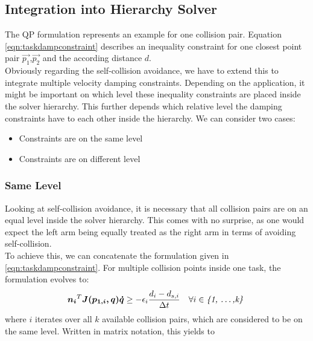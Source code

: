 \subsection{Integration into Hierarchy Solver}
The QP formulation represents an example for one collision pair. Equation \ref{eqn:taskdampconstraint} describes an inequality constraint for one closest point pair $\vec{p_1}$,$\vec{p_2}$ and the according distance $d$.\\
Obviously regarding the self-collision avoidance, we have to extend this to integrate multiple velocity damping constraints.
Depending on the application, it might be important on which level these inequality constraints are placed inside the solver hierarchy. This further depends which relative level the damping constraints have to each other inside the hierarchy. We can consider two cases:

\begin{itemize}
\item Constraints are on the same level
\item Constraints are on different level
\end{itemize}

\subsubsection*{Same Level}
Looking at self-collision avoidance, it is necessary that all collision pairs are on an equal level inside the solver hierarchy. This comes with no surprise, as one would expect the left arm being equally treated as the right arm in terms of avoiding self-collision. \\
To achieve this, we can concatenate the formulation given in \ref{eqn:taskdampconstraint}. For multiple collision points inside one task, the formulation evolves to:
\begin{equation}
\vec{n_i}^T\vec{J(p_{1,i},q)} \vec{\dot{q}} \geq - \epsilon_i \frac{d_i - d_{s,i}}{\Delta t} \quad \forall i \in \textit{\{1, \dots ,k\} }
\end{equation}
where $i$ iterates over all $k$ available collision pairs, which are considered to be on the same level. Written in matrix notation, this yields to

